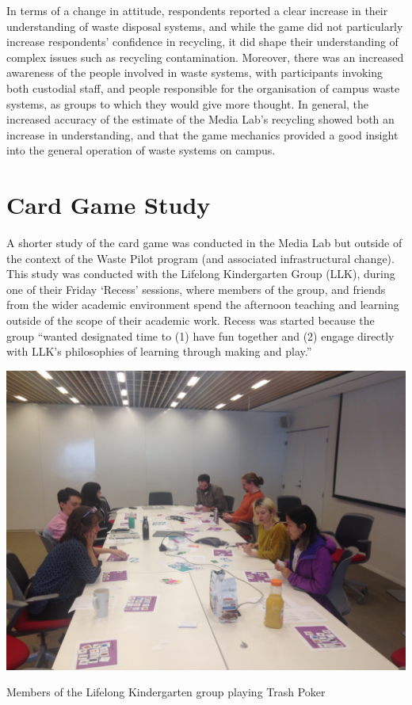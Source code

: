 \documentclass[nofonts,nols,justified,nobib]{tufte-book}
\begin{document}
In terms of a change in attitude, respondents reported a clear increase in their understanding of waste disposal systems, and while the game did not particularly increase respondents' confidence in recycling, it did shape their understanding of complex issues such as recycling contamination. Moreover, there was an increased awareness of the people involved in waste systems, with participants invoking both custodial staff, and people responsible for the organisation of campus waste systems, as groups to which they would give more thought. In general, the increased accuracy of the estimate of the Media Lab's recycling showed both an increase in understanding, and that the game mechanics provided a good insight into the general operation of waste systems on campus.


\newpage

\section*{Card Game Study}
A shorter study of the card game was conducted in the Media Lab but outside of the context of the Waste Pilot program (and associated infrastructural change). This study was conducted with the Lifelong Kindergarten Group (LLK), during one of their Friday `Recess' sessions, where members of the group, and friends from the wider academic environment spend the afternoon teaching and learning outside of the scope of their academic work. Recess was started because the group ``wanted designated time to (1) have fun together and (2) engage directly with LLK's philosophies of learning through making and play.'' \cite{otts_e-mail_2019}

\begin{marginfigure}
  \includegraphics[width=1\linewidth]{img/4/llk-trash.JPG}
  \caption{Members of the Lifelong Kindergarten group playing Trash Poker}
\end{marginfigure}
\end{document}

